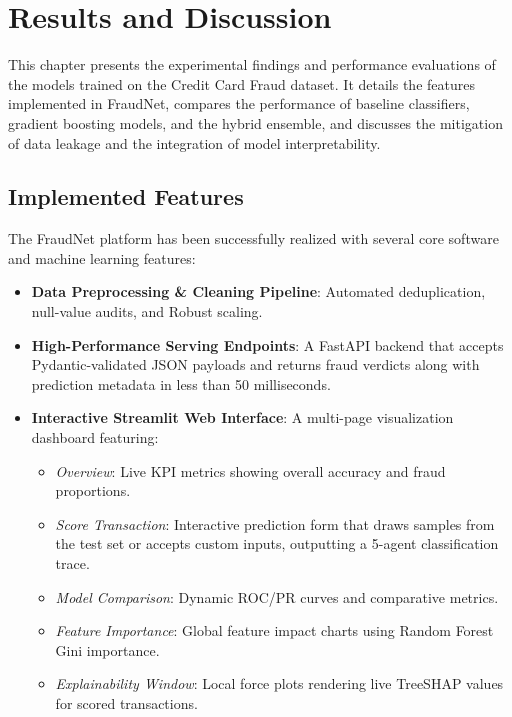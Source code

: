 \chapter{Results and Discussion}

This chapter presents the experimental findings and performance evaluations of the models trained on the Credit Card Fraud dataset. It details the features implemented in FraudNet, compares the performance of baseline classifiers, gradient boosting models, and the hybrid ensemble, and discusses the mitigation of data leakage and the integration of model interpretability.

\section{Implemented Features}

The FraudNet platform has been successfully realized with several core software and machine learning features:
\begin{itemize}
    \item \textbf{Data Preprocessing \& Cleaning Pipeline}: Automated deduplication, null-value audits, and Robust scaling.
    \item \textbf{High-Performance Serving Endpoints}: A FastAPI backend that accepts Pydantic-validated JSON payloads and returns fraud verdicts along with prediction metadata in less than 50 milliseconds.
    \item \textbf{Interactive Streamlit Web Interface}: A multi-page visualization dashboard featuring:
    \begin{itemize}
        \item \textit{Overview}: Live KPI metrics showing overall accuracy and fraud proportions.
        \item \textit{Score Transaction}: Interactive prediction form that draws samples from the test set or accepts custom inputs, outputting a 5-agent classification trace.
        \item \textit{Model Comparison}: Dynamic ROC/PR curves and comparative metrics.
        \item \textit{Feature Importance}: Global feature impact charts using Random Forest Gini importance.
        \item \textit{Explainability Window}: Local force plots rendering live TreeSHAP values for scored transactions.
    \end{itemize}
\end{itemize}


